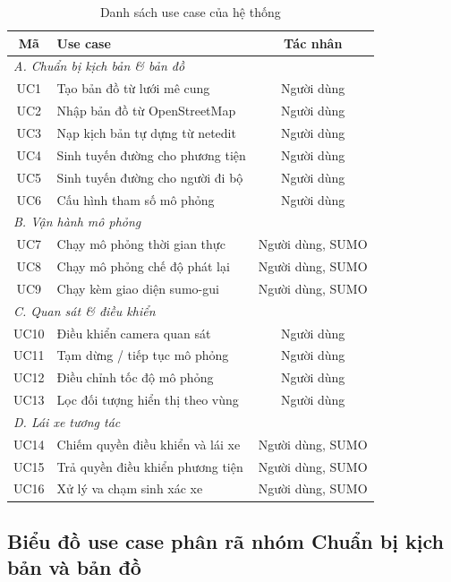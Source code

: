 ﻿\documentclass[../DoAn.tex]{subfiles}
\begin{document}
\begin{table}[H]
	\centering
	\caption{Danh sách use case của hệ thống}
	\label{tab:uc-list}
	\begin{tabular}{c p{} c}
		\hline
		\textbf{Mã} & \textbf{Use case} & \textbf{Tác nhân} \\
		\hline
		\multicolumn{3}{l}{\textit{A. Chuẩn bị kịch bản \& bản đồ}} \\
		UC1 & Tạo bản đồ từ lưới mê cung & Người dùng \\
		UC2 & Nhập bản đồ từ OpenStreetMap & Người dùng \\
		UC3 & Nạp kịch bản tự dựng từ netedit & Người dùng \\
		UC4 & Sinh tuyến đường cho phương tiện & Người dùng \\
		UC5 & Sinh tuyến đường cho người đi bộ & Người dùng \\
		UC6 & Cấu hình tham số mô phỏng & Người dùng \\
		\hline
		\multicolumn{3}{l}{\textit{B. Vận hành mô phỏng}} \\
		UC7 & Chạy mô phỏng thời gian thực & Người dùng, SUMO \\
		UC8 & Chạy mô phỏng chế độ phát lại & Người dùng, SUMO \\
		UC9 & Chạy kèm giao diện sumo-gui & Người dùng, SUMO \\
		\hline
		\multicolumn{3}{l}{\textit{C. Quan sát \& điều khiển}} \\
		UC10 & Điều khiển camera quan sát & Người dùng \\
		UC11 & Tạm dừng / tiếp tục mô phỏng & Người dùng \\
		UC12 & Điều chỉnh tốc độ mô phỏng & Người dùng \\
		UC13 & Lọc đối tượng hiển thị theo vùng & Người dùng \\
		\hline
		\multicolumn{3}{l}{\textit{D. Lái xe tương tác}} \\
		UC14 & Chiếm quyền điều khiển và lái xe & Người dùng, SUMO \\
		UC15 & Trả quyền điều khiển phương tiện & Người dùng, SUMO \\
		UC16 & Xử lý va chạm sinh xác xe & Người dùng, SUMO \\
		\hline
	\end{tabular}
\end{table}

\subsection{Biểu đồ use case phân rã nhóm Chuẩn bị kịch bản và bản đồ}
\label{subsection:2.2.2}
\end{document}
